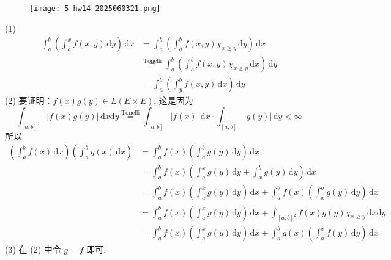 \begin{exercise}
\begin{figure}[H]
\centering
\texttt{[image: 5-hw14-2025060321.png]}
\label{}
\end{figure}
\end{exercise}
(1)
\[
\begin{aligned}
\int_{a}^{b} \left( \int_{a}^{x} f(x,y) \, \mathrm{d}y  \right) \, \mathrm{d}x  & =\int_{a}^{b} \left( \int_{a}^{b} f(x,y) \chi_{x\geq y}\, \mathrm{d}y  \right) \, \mathrm{d}x  \\
 & \overset{ \text{Tonelli}  }{ = }\int_{a}^{b} \left( \int_{a}^{b} f(x,y)\chi_{x\geq y} \, \mathrm{d}x  \right) \, \mathrm{d}y \\
  & =\int_{a}^{b} \left( \int_{y}^{b} f(x,y) \, \mathrm{d}x  \right) \, \mathrm{d}y  
\end{aligned}
\]
(2)
要证明：$f (x) g (y)\in L(E\times E)$. 这是因为
\[
\int_{[a,b]^2}^{} \lvert f(x)g(y) \rvert  \, \mathrm{d}x \mathrm{d}y\overset{ \text{Tonelli} }{ = }\int_{[a,b]}^{} \lvert f(x) \rvert  \, \mathrm{d}x \cdot \int_{[a,b]}^{} \lvert g(y) \rvert  \, \mathrm{d}y <\infty
\]
所以
\[
\begin{aligned}
\left( \int_{a}^{b} f(x)\, \mathrm{d}x \right) \left( \int_{a}^{b} g(x) \, \mathrm{d}x \right)  & =\int_{a}^{b} f(x)\left( \int_{a}^{b} g(y) \, \mathrm{d}y  \right)\, \mathrm{d}x \\
 & =\int_{a}^{b} f(x)\left( \int_{a}^{x} g(y) \, \mathrm{d}y+\int_{x}^{b} g(y) \, \mathrm{d}y   \right) \, \mathrm{d} x \\
  & =\int_{a}^{b} f(x)\left( \int_{a}^{x} g(y) \, \mathrm{d}y  \right) \, \mathrm{d}x +\int_{a}^{b} f(x) \left( \int_{x}^{b} g(y) \, \mathrm{d}y  \right) \, \mathrm{d}x  \\
 & =\int_{a}^{b} f(x)\left( \int_{a}^{x} g(y) \, \mathrm{d}y  \right) \, \mathrm{d}x +\int_{[a,b]^2}^{} f(x)g(y)\chi_{x\geq y} \, \mathrm{d}x \mathrm{d}y \\
 & =\int_{a}^{b} f(x)\left( \int_{a}^{x} g(y) \, \mathrm{d}y  \right) \, \mathrm{d}x +\int_{a}^{b} g(x) \left( \int_{a}^{x} f(y) \, \mathrm{d}y  \right)\, \mathrm{d}x 
\end{aligned}
\]
(3)
在 (2) 中令 $g=f$ 即可.

